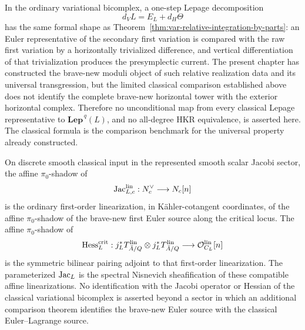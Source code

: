 \begin{remark}
\label{rem:var-classical-lepage-shadow}
In the ordinary variational bicomplex, a one-step Lepage decomposition
\[
    d_VL=E_L+d_H\Theta
\]
has the same formal shape as Theorem~\ref{thm:var-relative-integration-by-parts}: an Euler representative of the secondary first variation is compared with the raw first variation by a horizontally trivialized difference, and vertical differentiation of that trivialization produces the presymplectic current.  The present chapter has constructed the brave-new moduli object of such relative realization data and its universal transgression, but the limited classical comparison established above does not identify the complete brave-new horizontal tower with the exterior horizontal complex.  Therefore no unconditional map from every classical Lepage representative to \(\mathbf{Lep}^{\,q}(L)\), and no all-degree HKR equivalence, is asserted here.  The classical formula is the comparison benchmark for the universal property already constructed.
\end{remark}

\begin{proposition}
\label{prop:var-classical-jacobi-shadow}
On discrete smooth classical input in the represented smooth scalar Jacobi sector, the affine \(\pi_0\)-shadow of
\[
    \operatorname{Jac}^{\mathrm{lin}}_{L,c}:
    N_c^\vee
    \longrightarrow
    N_c[n]
\]
is the ordinary first-order linearization, in K\"ahler-cotangent coordinates, of the affine \(\pi_0\)-shadow of the brave-new first Euler source along the critical locus.  The affine \(\pi_0\)-shadow of
\[
    \operatorname{Hess}_L^{\mathrm{crit}}:
    j_L^*T^{\mathrm{lin}}_{\bar A/Q}
    \otimes
    j_L^*T^{\mathrm{lin}}_{\bar A/Q}
    \longrightarrow
    \mathcal O_{C_L}^{\mathrm{lin}}[n]
\]
is the symmetric bilinear pairing adjoint to that first-order linearization.  The parameterized \(\operatorname{Jac}_L\) is the spectral Nisnevich sheafification of these compatible affine linearizations.  No identification with the Jacobi operator or Hessian of the classical variational bicomplex is asserted beyond a sector in which an additional comparison theorem identifies the brave-new Euler source with the classical Euler--Lagrange source.
\end{proposition}

